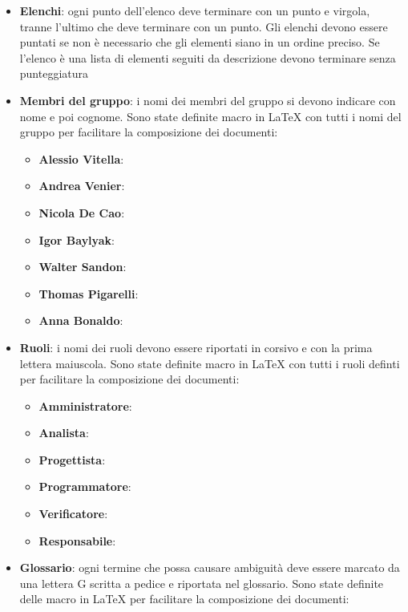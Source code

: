 \documentclass[12pt,a4paper]{article}
\begin{document}
\begin{itemize}
	\item \textbf{Elenchi}: ogni punto dell'elenco deve terminare con un punto e virgola, tranne l'ultimo che deve terminare con un punto. Gli elenchi devono essere puntati se non è necessario che gli elementi siano in un ordine preciso. Se l'elenco è una lista di elementi seguiti da descrizione devono terminare senza punteggiatura
	\item \textbf{Membri del gruppo}: i nomi dei membri del gruppo si devono indicare con nome e poi cognome. Sono state definite macro in \LaTeX{} con tutti i nomi del gruppo per facilitare la composizione dei documenti:
	\begin{itemize}
		\item \textbf{Alessio Vitella}: 
		\item \textbf{Andrea Venier}: 
		\item \textbf{Nicola De Cao}: 
		\item \textbf{Igor Baylyak}: 
		\item \textbf{Walter Sandon}: 
		\item \textbf{Thomas Pigarelli}: 
		\item \textbf{Anna Bonaldo}: 
	\end{itemize}
	\item \textbf{Ruoli}: i nomi dei ruoli devono essere riportati in corsivo e con la prima lettera maiuscola. Sono state definite macro in \LaTeX{} con tutti i ruoli definti per facilitare la composizione dei documenti:
	\begin{itemize}
		\item \textbf{Amministratore}: 
		\item \textbf{Analista}: 
		\item \textbf{Progettista}: 
		\item \textbf{Programmatore}: 
		\item \textbf{Verificatore}: 
		\item \textbf{Responsabile}: 
	\end{itemize}
	\item \textbf{Glossario}: ogni termine che possa causare ambiguità deve essere marcato da una lettera G scritta a pedice e riportata nel glossario. Sono state definite delle macro in \LaTeX{} per facilitare la composizione dei documenti:

\end{itemize}
\end{document}
